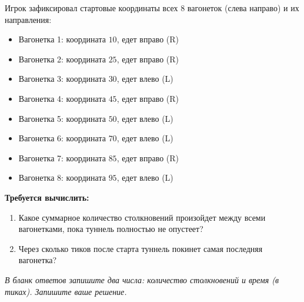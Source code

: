 \documentclass[12pt,a4paper]{article}
\begin{document}
Игрок зафиксировал стартовые координаты всех 8 вагонеток (слева направо) и их направления:
\begin{itemize}
    \item Вагонетка 1: координата $10$, едет вправо (R)
    \item Вагонетка 2: координата $25$, едет вправо (R)
    \item Вагонетка 3: координата $30$, едет влево (L)
    \item Вагонетка 4: координата $45$, едет вправо (R)
    \item Вагонетка 5: координата $50$, едет влево (L)
    \item Вагонетка 6: координата $70$, едет влево (L)
    \item Вагонетка 7: координата $85$, едет вправо (R)
    \item Вагонетка 8: координата $95$, едет влево (L)
\end{itemize}

\textbf{Требуется вычислить:}
\begin{enumerate}
    \item Какое суммарное количество столкновений произойдет между всеми вагонетками, пока туннель полностью не опустеет?
    \item Через сколько тиков после старта туннель покинет самая последняя вагонетка?
\end{enumerate}

\textit{В бланк ответов запишите два числа: количество столкновений и время (в тиках). Запишите ваше решение.}
\end{document}
